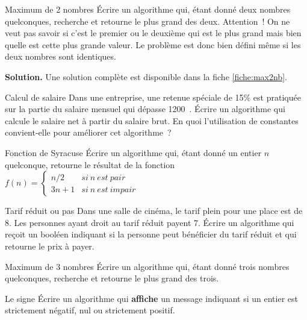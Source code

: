	\begin{Exercice}{Maximum de 2 nombres}
		Écrire un algorithme qui, étant donné deux nombres quelconques,
		recherche et retourne le plus grand des deux. Attention~! On ne veut
		pas savoir si c’est le premier ou le deuxième qui est
		le plus grand mais bien quelle est cette plus grande valeur. Le
		problème est donc bien défini même si les deux nombres sont
		identiques.
		
		\textbf{Solution.}
		Une solution complète est disponible dans la fiche \vref{fiche:max2nb}.
	\end{Exercice}
	
	\begin{Exercice}{Calcul de salaire}
		Dans une entreprise, 
		une retenue spéciale de 15\% est pratiquée 
		sur la partie du salaire mensuel qui dépasse 1200~\texteuro. 
		Écrire un algorithme qui calcule le salaire net à partir du salaire brut. 
		En quoi l’utilisation de constantes convient-elle pour améliorer cet algorithme~?
	\end{Exercice}

	\begin{Exercice}{Fonction de Syracuse}
		Écrire un algorithme qui, étant donné un entier $n$ quelconque,
		retourne le résultat de la fonction
		$f(n)=
			\left\{
			\begin{array}{rl}
				n/2 & si \ n \ est\ pair\\
				3n+1 & si \ n \ est \ impair
			\end{array}
			\right.$
	\end{Exercice}

	\begin{Exercice}{Tarif réduit ou pas}
		Dans une salle de cinéma,
		le tarif plein pour une place est de 8\texteuro{}.
		Les personnes ayant droit au tarif réduit payent 7\texteuro{}.
		Écrire un algorithme qui reçoit un booléen
		indiquant si la personne peut bénéficier du tarif réduit
		et qui retourne le prix à payer.
	\end{Exercice}
		
	\begin{Exercice}{Maximum de 3 nombres}
		Écrire un algorithme qui, étant donné trois nombres quelconques,
		recherche et retourne le plus grand des trois.
	\end{Exercice}
	
	\begin{Exercice}{Le signe}
		Écrire un algorithme qui \textbf{affiche} un message indiquant
		si un entier est strictement négatif, nul ou strictement
		positif.
	\end{Exercice}

